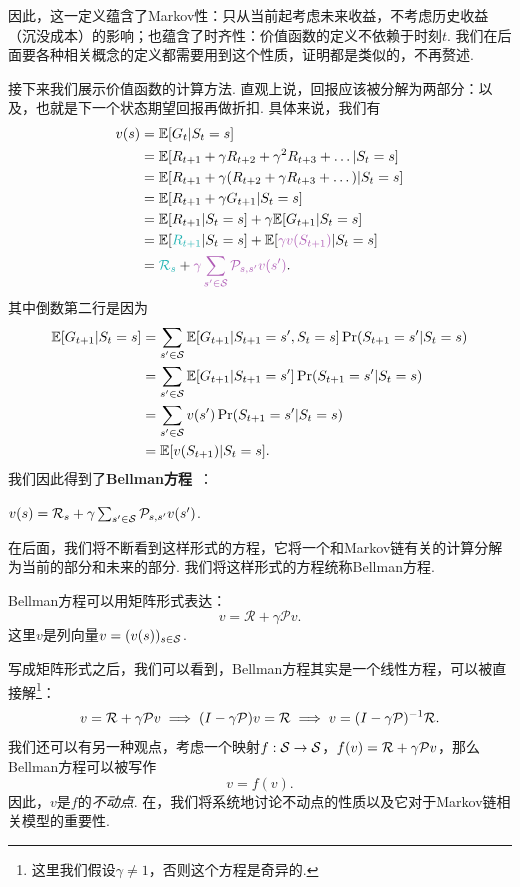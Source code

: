 因此，这一定义蕴含了Markov性：只从当前起考虑未来收益，不考虑历史收益（沉没成本）的影响；也蕴含了时齐性：价值函数的定义不依赖于时刻$t$. 我们在后面要各种相关概念的定义都需要用到这个性质，证明都是类似的，不再赘述.

接下来我们展示价值函数的计算方法. 直观上说，回报应该被分解为两部分：以及，也就是下一个状态期望回报再做折扣. 具体来说，我们有
\begin{align*}
v(s) &= \E[G_t|S_t=s] \\
    &= \E[R_{t+1}+ \gamma R_{t+2} + \gamma^2 R_{t+3}+\dots | S_t= s] \\
    &= \E[R_{t+1} + \gamma (R_{t+2}+\gamma R_{t+3}+\dots) | S_t = s] \\
    &= \E[R_{t+1} + \gamma G_{t+1} | S_t = s] \\
    &= \E[R_{t+1} | S_t = s] + \gamma \E[G_{t+1} | S_t = s] \\
    &= \E[\contrastlight{R_{t+1}}|S_t=s] + \E[\light{\gamma v(S_{t+1})}|S_t=s]\\
    &= \contrastlight{\mathcal R_s} + \light{\gamma \sum_{s'\in \calS}\calP_{s,s'}v(s')}.
\end{align*}
其中倒数第二行是因为
\begin{align*}
    \mathbb{E}[G_{t+1}|S_t=s] &= \sum_{s'\in \mathcal S}\mathbb{E}[G_{t+1}|S_{t+1}=s',S_t=s]\Pr(S_{t+1}=s'|S_t=s)\\
    &= \sum_{s'\in \mathcal S}\mathbb{E}[G_{t+1}|S_{t+1}=s']\Pr(S_{t+1}=s'|S_t=s)\\
    &= \sum_{s'\in \mathcal S}v(s')\Pr(S_{t+1}=s'|S_t=s)\\
    &=\mathbb{E}[v(S_{t+1})|S_t=s].
\end{align*}
我们因此得到了\textbf{Bellman方程}~\cite{bellmanTheoryDynamicProgramming1952}：
\begin{theorem}[Bellman方程]\label{theorem:MRP-Bellman}
    $v(s)=\mathcal R_s + \gamma \sum_{s'\in \mathcal S}\mathcal P_{s,s'}v(s')$.
\end{theorem}

在后面，我们将不断看到这样形式的方程，它将一个和Markov链有关的计算分解为当前的部分和未来的部分. 我们将这样形式的方程统称Bellman方程. 

Bellman方程可以用矩阵形式表达：
        \[v = \mathcal R + \gamma \mathcal P v.\]
这里$v$是列向量$v=(v(s))_{s\in\mathcal S}$.

写成矩阵形式之后，我们可以看到，Bellman方程其实是一个线性方程，可以被直接解\footnote{这里我们假设$\gamma\neq 1$，否则这个方程是奇异的.}：
\[
    v =\mathcal R + \gamma \mathcal P v \implies (I-\gamma \mathcal P)v = \mathcal R \implies v = (I-\gamma \mathcal P)^{-1} \mathcal R.
\]
我们还可以有另一种观点，考虑一个映射$f:\mathcal S\to \mathcal S$，$f(v)=\mathcal R + \gamma \mathcal P v$，那么Bellman方程可以被写作
\[v=f(v).\]
因此，$v$是$f$的\textit{不动点}. 在，我们将系统地讨论不动点的性质以及它对于Markov链相关模型的重要性.

